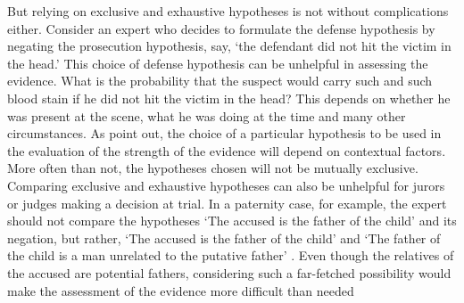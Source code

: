 \documentclass{article}
\begin{document}
But relying on exclusive and exhaustive hypotheses is not without complications either. Consider an expert who decides to formulate the defense hypothesis by negating the prosecution hypothesis, say, `the defendant did not hit the victim in the head.' This choice of defense hypothesis can be unhelpful in assessing the evidence.
What is the probability that the suspect would carry such and such blood stain if he did not hit the victim in the head? This depends on whether he was present at the scene, what he was doing at the time and many other circumstances. %
As \citet{evett2000MoreHierarchyPropositions} point out, the choice of a particular hypothesis to be used in the evaluation of the strength of the evidence 
will depend on contextual factors. %
More often than not, the hypotheses chosen will not be mutually exclusive. 
%
Comparing exclusive and exhaustive hypotheses can also be unhelpful for jurors or judges making a decision at trial.
In a paternity case, for example, %
the expert should not compare the hypotheses `The accused is the father of the child' and  its negation, but rather, `The accused is the father of the child' and  `The father of the child is a man unrelated to the putative father' \citep{biedermann2014UseLikelihoodRatio}. 
Even though the relatives of the accused are potential fathers, considering such a far-fetched possibility would make the assessment of the evidence more difficult than needed  %
%
\end{document}
